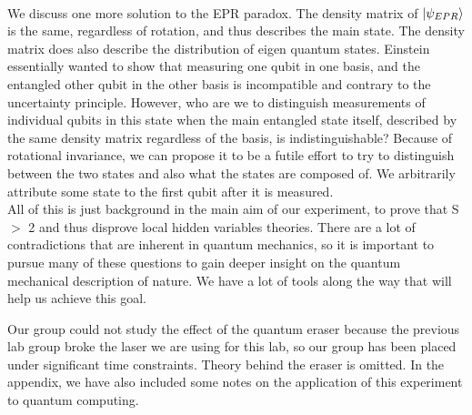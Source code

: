 \documentclass{article}
\begin{document}
    \\\indent We discuss one more solution to the EPR paradox. The density matrix of $\left\vert{\psi_{EPR}}\right\rangle$ is the same, regardless of rotation, and thus describes the main state. The density matrix does also describe the distribution of eigen quantum states. Einstein essentially wanted to show that measuring one qubit in one basis, and the entangled other qubit in the other basis is incompatible and contrary to the uncertainty principle. However, who are we to distinguish measurements of individual qubits in this state when the main entangled state itself, described by the same density matrix regardless of the basis, is indistinguishable? Because of rotational invariance, we can propose it to be a futile effort to try to distinguish between the two states and also what the states are composed of. We arbitrarily attribute some state to the first qubit after it is measured.
    \\\indent All of this is just background in the main aim of our experiment, to prove that S $>$ 2 and thus disprove local hidden variables theories. There are a lot of contradictions that are inherent in quantum mechanics, so it is important to pursue many of these questions to gain deeper insight on the quantum mechanical description of nature. We have a lot of tools along the way that will help us achieve this goal.
    
    Our group could not study the effect of the quantum eraser because the previous lab group broke the laser we are using for this lab, so our group has been placed under significant time constraints. Theory behind the eraser is omitted. In the appendix, we have also included some notes on the application of this experiment to quantum computing.
\end{document}
